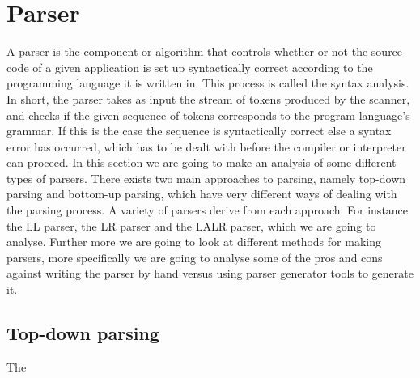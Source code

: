 \section{Parser}
\label{sec:parser}

A parser is the component or algorithm that controls whether or not the source code of a given application is set up syntactically correct according to the programming language it is written in. This process is called the syntax analysis. In short, the parser takes as input the stream of tokens produced by the scanner, and checks if the given sequence of tokens corresponds to the program language's grammar. If this is the case the sequence is syntactically correct else a syntax error has occurred, which has to be dealt with before the compiler or interpreter can proceed. In this section we are going to make an analysis of some different types of parsers. There exists two main approaches to parsing, namely top-down parsing and bottom-up parsing, which have very different ways of dealing with the parsing process. A variety of parsers derive from each approach. For instance the LL parser, the LR parser and the LALR parser, which we are going to analyse. Further more we are going to look at different methods for making parsers, more specifically we are going to analyse some of the pros and cons against writing the parser by hand versus using parser generator tools to generate it.

\subsection{Top-down parsing}

The 



   